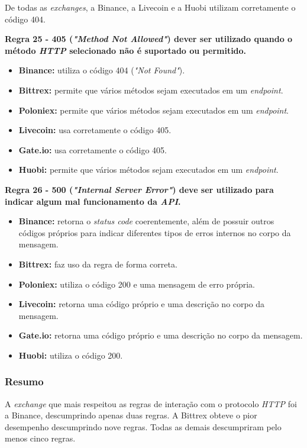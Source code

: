 De todas as \textit{exchanges}, a Binance, a Livecoin e a Huobi utilizam corretamente o código 404.

\textbf{Regra 25 - 405 (\textit{"Method Not Allowed"}) dever ser utilizado quando o método \textit{HTTP} selecionado não é suportado ou permitido.}

\begin{itemize}
    \item \textbf{Binance:} utiliza o código 404 (\textit{"Not Found"}).
    \item \textbf{Bittrex:} permite que vários métodos sejam executados em um \textit{endpoint}.
    \item \textbf{Poloniex:} permite que vários métodos sejam executados em um \textit{endpoint}.
    \item \textbf{Livecoin:} usa corretamente o código 405.
    \item \textbf{Gate.io:} usa corretamente o código 405.
    \item \textbf{Huobi:} permite que vários métodos sejam executados em um \textit{endpoint}.
\end{itemize}

\textbf{Regra 26 - 500 (\textit{"Internal Server Error"}) deve ser utilizado para indicar algum mal funcionamento da \textit{API}.}

\begin{itemize}
    \item \textbf{Binance:} retorna o \textit{status code} coerentemente, além de possuir outros códigos próprios para indicar diferentes tipos de erros internos no corpo da mensagem.
    \item \textbf{Bittrex:} faz uso da regra de forma correta.
    \item \textbf{Poloniex:} utiliza o código 200 e uma mensagem de erro própria.
    \item \textbf{Livecoin:} retorna uma código próprio e uma descrição no corpo da mensagem.
    \item \textbf{Gate.io:} retorna uma código próprio e uma descrição no corpo da mensagem.
    \item \textbf{Huobi:} utiliza o código 200.
\end{itemize}

\subsubsection{Resumo}

A \textit{exchange} que mais respeitou as regras de interação com o protocolo \textit{HTTP} foi a Binance, descumprindo apenas duas regras. A Bittrex obteve o pior desempenho descumprindo nove regras. Todas as demais descumpriram pelo menos cinco regras.

